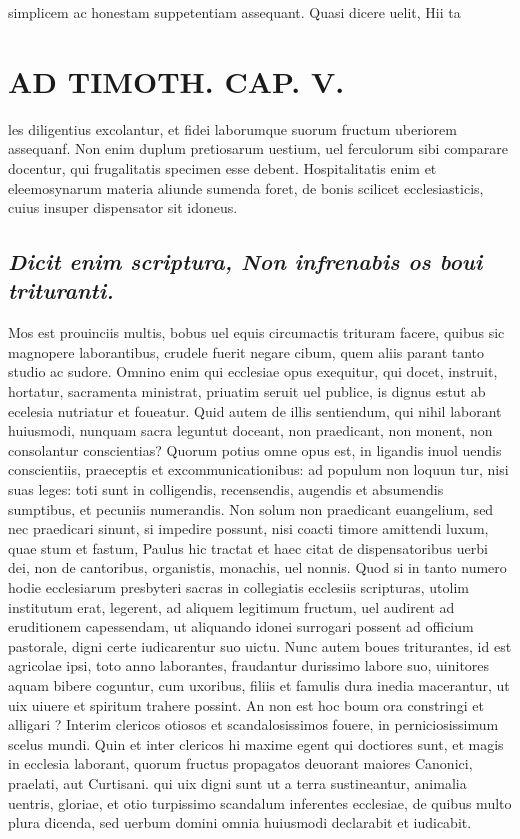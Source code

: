 \documentclass{article}
\begin{document}
\begin{pages}
simplicem ac honestam suppetentiam assequant. Quasi dicere uelit, Hii ta\pend
\section*{AD TIMOTH. CAP. V. }
\marginpar{[ p.523 ]}\pstart les diligentius excolantur, et fidei laborumque suorum fructum uberiorem assequanf. Non enim duplum pretiosarum uestium, uel ferculorum sibi comparare docentur, qui frugalitatis specimen esse debent. Hospitalitatis enim et eleemosynarum materia aliunde sumenda foret, de bonis scilicet ecclesiasticis, cuius insuper dispensator sit idoneus.  \pend
{}
{}
\subsection*{\textit{Dicit enim scriptura, Non infrenabis os boui trituranti. }}\pstart Mos est prouinciis multis, bobus uel equis circumactis trituram facere, quibus sic magnopere laborantibus, crudele fuerit negare cibum, quem aliis parant tanto studio ac sudore. Omnino enim qui ecclesiae opus exequitur, qui docet, instruit, hortatur, sacramenta ministrat, priuatim seruit uel publice, is dignus estut ab ecelesia nutriatur et foueatur. Quid autem de illis sentiendum, qui nihil laborant huiusmodi, nunquam sacra leguntut doceant, non praedicant, non monent, non consolantur conscientias? Quorum potius omne opus est, in ligandis inuol uendis conscientiis, praeceptis et excommunicationibus: ad populum non loquun tur, nisi suas leges: toti sunt in colligendis, recensendis, augendis et absumendis sumptibus, et pecuniis numerandis. Non solum non praedicant euangelium, sed nec praedicari sinunt, si impedire possunt, nisi coacti timore amittendi luxum, quae stum et fastum, Paulus hic tractat et haec citat de dispensatoribus uerbi dei, non de cantoribus, organistis, monachis, uel nonnis. Quod si in tanto numero hodie ecclesiarum presbyteri sacras in collegiatis ecclesiis scripturas, utolim institutum erat, legerent, ad aliquem legitimum fructum, uel audirent ad eruditionem capessendam, ut aliquando idonei surrogari possent ad officium pastorale, digni certe iudicarentur suo uictu. Nunc autem boues triturantes, id est agricolae ipsi, toto anno laborantes, fraudantur durissimo labore suo, uinitores aquam bibere coguntur, cum uxoribus, filiis et famulis dura inedia macerantur, ut uix uiuere et spiritum trahere possint. An non est hoc boum ora constringi et alligari ? Interim clericos otiosos et scandalosissimos fouere, in perniciosissimum scelus mundi. Quin et inter clericos hi maxime egent qui doctiores sunt, et magis in ecclesia laborant, quorum fructus propagatos deuorant maiores Canonici, praelati, aut Curtisani. qui uix digni sunt ut a terra sustineantur, animalia uentris, gloriae, et otio turpissimo scandalum inferentes ecclesiae, de quibus multo plura dicenda, sed uerbum domini omnia huiusmodi declarabit et iudicabit.  \pend
{}
{}

\end{pages}
\end{document}
